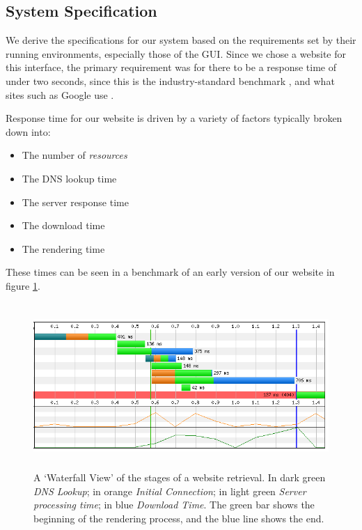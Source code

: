 

\subsection{System Specification}\label{sec-specs}

We derive the specifications for our system based on the requirements
set by their running environments, especially those of the GUI. Since
we chose a website for this interface, the primary requirement was for
there to be a response time of under two seconds, since this is the
industry-standard benchmark \cite{akamai}, and what sites such as
Google use \cite{two-seconds}.

Response time for our website is driven by a variety of factors
typically broken down into:

\begin{itemize}
  \item The number of \emph{resources}
  \item The DNS lookup time
  \item The server response time
  \item The download time
  \item The rendering time
\end{itemize}

These times can be seen in a benchmark of an early version of our
website in figure \ref{fig-website-benchmark}.

\begin{figure}[htp]
  \centering
  \includegraphics[height=6.27cm]{graphics/performance.png}
  \caption{A `Waterfall View' of the stages of a website retrieval. In
  dark green \emph{DNS Lookup}; in orange \emph{Initial Connection};
  in light green \emph{Server processing time}; in blue \emph{Download
  Time}. The green bar shows the beginning of the rendering process,
and the blue line shows the end.}
  \label{fig-website-benchmark}
\end{figure}

